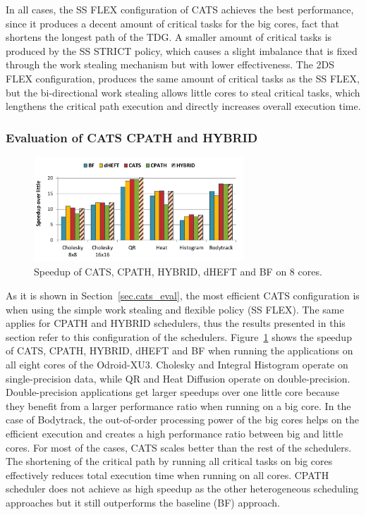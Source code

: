 In all cases, the SS FLEX configuration of CATS achieves the best performance, since it produces a decent amount of critical tasks for the big cores, fact that shortens the longest path of the TDG. 
A smaller amount of critical tasks is produced by the SS STRICT policy, which causes a slight imbalance that is fixed through the work stealing mechanism but with lower effectiveness. 
The 2DS FLEX configuration, produces the same amount of critical tasks as the SS FLEX, but the bi-directional work stealing allows little cores to steal critical tasks, which lengthens the critical path execution and directly increases overall execution time.

\subsubsection{Evaluation of CATS CPATH and HYBRID}
\begin{figure}[!t]
	\centering
	\includegraphics[width=0.7\textwidth]{figures/8cores.pdf}
	\caption{Speedup of CATS, CPATH, HYBRID, dHEFT and BF on 8 cores.}
	\label{BFLinear}
	\vspace{-0.4cm}
\end{figure}
As it is shown in Section~\ref{sec.cats_eval}, the most efficient CATS configuration is when using the simple work stealing and flexible policy (SS FLEX).
The same applies for CPATH and HYBRID schedulers, thus the results presented in this section refer to this configuration of the schedulers. 
Figure~\ref{BFLinear} shows the speedup of CATS, CPATH, HYBRID, dHEFT and BF when running the applications on all eight cores of the Odroid-XU3. Cholesky and Integral Histogram operate on single-precision data, while QR and Heat Diffusion operate on double-precision. 
Double-precision applications get larger speedups over one little core because they benefit from a larger performance ratio when running on a big core. In the case of Bodytrack, the out-of-order processing power of the big cores helps on the efficient execution and creates a high performance ratio between big and little cores. 
For most of the cases, CATS scales better than the rest of the schedulers. 
The shortening of the critical path by running all critical tasks on big cores effectively reduces total execution time when running on all cores. 
CPATH scheduler does not achieve as high speedup as the other heterogeneous scheduling approaches but it still outperforms the baseline (BF) approach.


